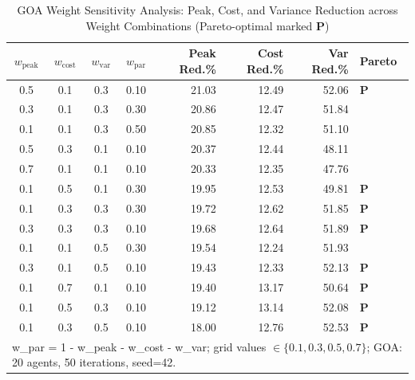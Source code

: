 \begin{table}[htbp]
\centering
\caption{GOA Weight Sensitivity Analysis: Peak, Cost, and Variance Reduction across Weight Combinations (Pareto-optimal marked \textbf{P})}
\label{tab:sensitivity}
\begin{tabular}{ccccrrrl}
\hline
$w_\text{peak}$ & $w_\text{cost}$ & $w_\text{var}$ & $w_\text{par}$ & \textbf{Peak Red.\%} & \textbf{Cost Red.\%} & \textbf{Var Red.\%} & \textbf{Pareto} \\
\hline
0.5 & 0.1 & 0.3 & 0.10 & 21.03 & 12.49 & 52.06 & \textbf{P} \\
0.3 & 0.1 & 0.3 & 0.30 & 20.86 & 12.47 & 51.84 &  \\
0.1 & 0.1 & 0.3 & 0.50 & 20.85 & 12.32 & 51.10 &  \\
0.5 & 0.3 & 0.1 & 0.10 & 20.37 & 12.44 & 48.11 &  \\
0.7 & 0.1 & 0.1 & 0.10 & 20.33 & 12.35 & 47.76 &  \\
0.1 & 0.5 & 0.1 & 0.30 & 19.95 & 12.53 & 49.81 & \textbf{P} \\
0.1 & 0.3 & 0.3 & 0.30 & 19.72 & 12.62 & 51.85 & \textbf{P} \\
0.3 & 0.3 & 0.3 & 0.10 & 19.68 & 12.64 & 51.89 & \textbf{P} \\
0.1 & 0.1 & 0.5 & 0.30 & 19.54 & 12.24 & 51.93 &  \\
0.3 & 0.1 & 0.5 & 0.10 & 19.43 & 12.33 & 52.13 & \textbf{P} \\
0.1 & 0.7 & 0.1 & 0.10 & 19.40 & 13.17 & 50.64 & \textbf{P} \\
0.1 & 0.5 & 0.3 & 0.10 & 19.12 & 13.14 & 52.08 & \textbf{P} \\
0.1 & 0.3 & 0.5 & 0.10 & 18.00 & 12.76 & 52.53 & \textbf{P} \\
\hline
\multicolumn{8}{l}{\footnotesize w\_par = 1 - w\_peak - w\_cost - w\_var; grid values $\in \{0.1, 0.3, 0.5, 0.7\}$; GOA: 20 agents, 50 iterations, seed=42.} \\
\end{tabular}
\end{table}